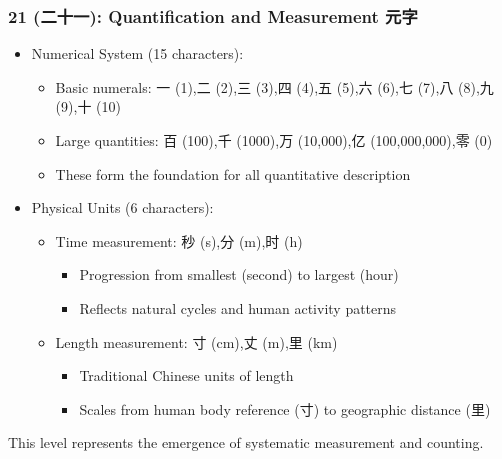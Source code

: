 \documentclass[11pt,letterpaper]{article}
\begin{document}
\subsubsection{21 (二十一): Quantification and Measurement 元字} 


  \begin{itemize}
  \tightlist
  \item
    Numerical System (15 characters):

    \begin{itemize}
    \tightlist
    \item
      Basic numerals: 一 (1),二 (2),三 (3),四 (4),五 (5),六 (6),七
      (7),八 (8),九 (9),十 (10)
    \item
      Large quantities: 百 (100),千 (1000),万 (10,000),亿
      (100,000,000),零 (0)
    \item
      These form the foundation for all quantitative description
    \end{itemize}
  \item
    Physical Units (6 characters):

    \begin{itemize}
    \tightlist
    \item
      Time measurement: 秒 (s),分 (m),时 (h)

      \begin{itemize}
      \tightlist
      \item
        Progression from smallest (second) to largest (hour)
      \item
        Reflects natural cycles and human activity patterns
      \end{itemize}
    \item
      Length measurement: 寸 (cm),丈 (m),里 (km)

      \begin{itemize}
      \tightlist
      \item
        Traditional Chinese units of length
      \item
        Scales from human body reference (寸) to geographic distance
        (里)
      \end{itemize}
    \end{itemize}
  \end{itemize}

This level represents the emergence of systematic measurement and
counting.
\end{document}
